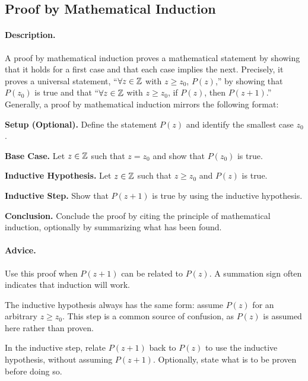\subsection{Proof by Mathematical Induction}
\label{subsections:techniques:universal:induction}



\paragraph{Description.}
A proof by mathematical induction proves a mathematical statement by %
showing that it holds for a first case and that each case implies the %
next. %
Precisely, it proves a universal statement, %
``$\forall z \in \mathbb{Z}$ with $z \ge z_0$, $P(z)$,'' %
by showing that $P(z_0)$ is true and that %
``$\forall z \in \mathbb{Z}$ with $z \ge z_0$, if $P(z)$, then $P(z + 1)$.'' %
Generally, a proof by mathematical induction mirrors the following format:
\begin{enumerate}{
    \item \textbf{Setup (Optional).} %
        Define the statement $P(z)$ and identify the smallest case $z_0$.
    \item \textbf{Base Case.} %
        Let $z \in \mathbb{Z}$ such that $z = z_0$ and show that $P(z_0)$ is true.
    \item \textbf{Inductive Hypothesis.} %
        Let $z \in \mathbb{Z}$ such that $z \ge z_0$ and $P(z)$ is true.
    \item \textbf{Inductive Step.} %
        Show that $P(z + 1)$ is true by using the inductive hypothesis.
    \item \textbf{Conclusion.} %
        Conclude the proof by citing the principle of mathematical %
        induction, optionally by summarizing what has been found.
}
\end{enumerate}



\paragraph{Advice.}
\begin{itemize}{
    \item Use this proof when $P(z + 1)$ can be related to $P(z)$. %
        A summation sign often indicates that induction will work.
    \item The inductive hypothesis always has the same form: %
        assume $P(z)$ for an arbitrary $z \ge z_0$. %
        This step is a common source of confusion, as $P(z)$ is assumed %
        here rather than proven.
    \item In the inductive step, relate $P(z + 1)$ back to $P(z)$ to use %
        the inductive hypothesis, without assuming $P(z + 1)$. %
        Optionally, state what is to be proven before doing so.
}
\end{itemize}



